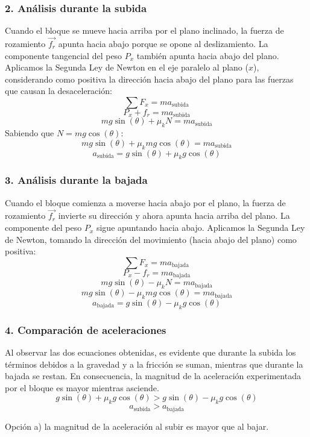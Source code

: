 \documentclass[12pt, a4paper]{article}
\begin{document}
\subsubsection*{2. Análisis durante la subida}
Cuando el bloque se mueve hacia arriba por el plano inclinado, la fuerza de rozamiento $\vec{f_r}$ apunta hacia abajo porque se opone al deslizamiento. La componente tangencial del peso $P_x$ también apunta hacia abajo del plano.
Aplicamos la Segunda Ley de Newton en el eje paralelo al plano ($x$), considerando como positiva la dirección hacia abajo del plano para las fuerzas que causan la desaceleración:
$$ \sum F_x = m a_{\text{subida}} $$
$$ P_x + f_r = m a_{\text{subida}} $$
$$ m g \sin(\theta) + \mu_k N = m a_{\text{subida}} $$
Sabiendo que $N = m g \cos(\theta)$:
$$ m g \sin(\theta) + \mu_k m g \cos(\theta) = m a_{\text{subida}} $$
$$ a_{\text{subida}} = g \sin(\theta) + \mu_k g \cos(\theta) $$

\subsubsection*{3. Análisis durante la bajada}
Cuando el bloque comienza a moverse hacia abajo por el plano, la fuerza de rozamiento $\vec{f_r}$ invierte su dirección y ahora apunta hacia arriba del plano. La componente del peso $P_x$ sigue apuntando hacia abajo.
Aplicamos la Segunda Ley de Newton, tomando la dirección del movimiento (hacia abajo del plano) como positiva:
$$ \sum F_x = m a_{\text{bajada}} $$
$$ P_x - f_r = m a_{\text{bajada}} $$
$$ m g \sin(\theta) - \mu_k N = m a_{\text{bajada}} $$
$$ m g \sin(\theta) - \mu_k m g \cos(\theta) = m a_{\text{bajada}} $$
$$ a_{\text{bajada}} = g \sin(\theta) - \mu_k g \cos(\theta) $$

\subsubsection*{4. Comparación de aceleraciones}
Al observar las dos ecuaciones obtenidas, es evidente que durante la subida los términos debidos a la gravedad y a la fricción se suman, mientras que durante la bajada se restan. En consecuencia, la magnitud de la aceleración experimentada por el bloque es mayor mientras asciende.
$$ g \sin(\theta) + \mu_k g \cos(\theta) > g \sin(\theta) - \mu_k g \cos(\theta) $$
$$ a_{\text{subida}} > a_{\text{bajada}} $$

\begin{tcolorbox}[colback=green!5!white, colframe=green!50!black, title=Respuesta Final]
\centering Opción a) la magnitud de la aceleración al subir es mayor que al bajar.
\end{tcolorbox}
\end{document}
